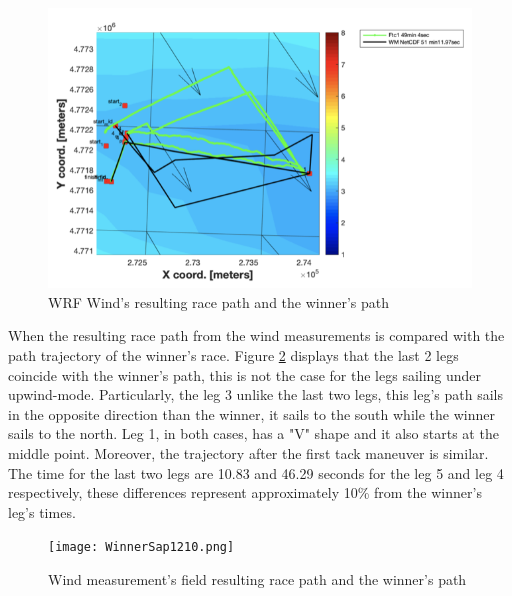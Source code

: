 \begin{figure}[hbt!]
    \centering
    \includegraphics[width=1\linewidth]{images/WinnerNet1210.png}
    \caption{WRF Wind's resulting race path and the winner's path}
    \label{fig:WRF_Winner_start}
\end{figure}

When the resulting race path from the wind measurements is compared with the path trajectory of the winner's race.  Figure \ref{fig:Sap_Winner_start} displays that the last 2 legs coincide with the winner's path, this is not the case for the legs sailing under upwind-mode. Particularly, the leg 3 unlike the last two legs, this leg's path sails in the opposite direction than the winner, it sails to the south while the winner sails to the north. Leg 1, in both cases, has a "V" shape and it also starts at the middle point. Moreover, the trajectory after the first tack maneuver is similar. The time for the last two legs are 10.83 and 46.29 seconds for the leg 5 and leg 4 respectively, these differences represent approximately 10\% from the winner's leg's times. \par   

\begin{figure}[t]
    \centering
    \texttt{[image: WinnerSap1210.png]}
    \caption{Wind measurement's field resulting race path and the winner's path}
    \label{fig:Sap_Winner_start}
\end{figure}

